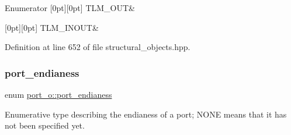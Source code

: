 \begin{DoxyEnumFields}{Enumerator}
[0pt][0pt]{}\mbox{\label{structport__o_adb254df5665ff28b0769491cc3899fd5a867884fd1b73b0d8a062cd76f10673db}} 
T\+L\+M\+\_\+\+O\+UT&\\
\hline

[0pt][0pt]{}\mbox{\label{structport__o_adb254df5665ff28b0769491cc3899fd5a26a8eb84646e49d464cd4e456ede4324}} 
T\+L\+M\+\_\+\+I\+N\+O\+UT&\\
\hline

\end{DoxyEnumFields}


Definition at line 652 of file structural\+\_\+objects.\+hpp.

\mbox{\label{structport__o_a7f16c53245215df0064e1b8ef27a36e3}} 
\subsubsection{\texorpdfstring{port\+\_\+endianess}{port\_endianess}}
{\footnotesize\ttfamily enum \hyperlink{structport__o_a7f16c53245215df0064e1b8ef27a36e3}{port\+\_\+o\+::port\+\_\+endianess}}



Enumerative type describing the endianess of a port; N\+O\+NE means that it has not been specified yet. 

